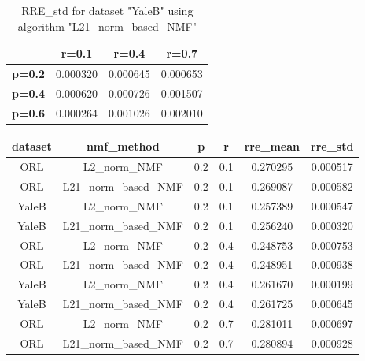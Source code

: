 \begin{table}[h]
\centering
\begin{tabular}{|c|c|c|c|}
\hline
\textbf{}      & \textbf{r=0.1} & \textbf{r=0.4} & \textbf{r=0.7} \\ \hline
\textbf{p=0.2} & 0.000320       & 0.000645       & 0.000653       \\ \hline
\textbf{p=0.4} & 0.000620       & 0.000726       & 0.001507       \\ \hline
\textbf{p=0.6} & 0.000264       & 0.001026       & 0.002010       \\ \hline
\end{tabular}
\caption{RRE\_std for dataset "YaleB" using algorithm "L21\_norm\_based\_NMF"}
\end{table}

\begin{table}[p]
\centering
\begin{tabular}{cccccc}
\hline
\textbf{dataset} & \textbf{nmf\_method}  & \textbf{p} & \textbf{r} & \textbf{rre\_mean} & \textbf{rre\_std} \\ \hline
ORL              & L2\_norm\_NMF         & 0.2        & 0.1        & 0.270295           & 0.000517          \\
ORL              & L21\_norm\_based\_NMF & 0.2        & 0.1        & 0.269087           & 0.000582          \\
YaleB            & L2\_norm\_NMF         & 0.2        & 0.1        & 0.257389           & 0.000547          \\
YaleB            & L21\_norm\_based\_NMF & 0.2        & 0.1        & 0.256240           & 0.000320          \\
ORL              & L2\_norm\_NMF         & 0.2        & 0.4        & 0.248753           & 0.000753          \\
ORL              & L21\_norm\_based\_NMF & 0.2        & 0.4        & 0.248951           & 0.000938          \\
YaleB            & L2\_norm\_NMF         & 0.2        & 0.4        & 0.261670           & 0.000199          \\
YaleB            & L21\_norm\_based\_NMF & 0.2        & 0.4        & 0.261725           & 0.000645          \\
ORL              & L2\_norm\_NMF         & 0.2        & 0.7        & 0.281011           & 0.000697          \\
ORL              & L21\_norm\_based\_NMF & 0.2        & 0.7        & 0.280894           & 0.000928          \\

\end{tabular}
\end{table}
